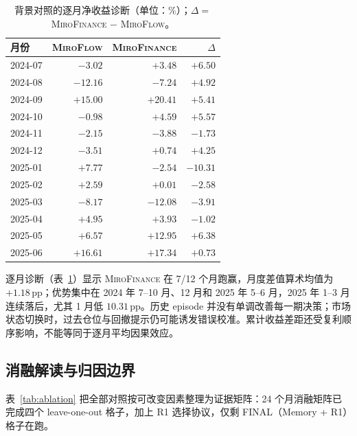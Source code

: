 \documentclass[11pt]{article}
\newcommand{\miroflow}{\textsc{MiroFlow}}
\newcommand{\memskill}{\textsc{MiroFinance}}
\newcommand{\pp}{\,\mathrm{pp}}
\begin{document}
\begin{table}[t]
\centering
\small
\begin{tabular}{@{}lrrr@{}}
\toprule
\textbf{月份} & \textbf{\miroflow{}} & \textbf{\memskill{}} & $\Delta$ \\
\midrule
2024-07 & $-3.02$ & $+3.48$ & $+6.50$ \\
2024-08 & $-12.16$ & $-7.24$ & $+4.92$ \\
2024-09 & $+15.00$ & $+20.41$ & $+5.41$ \\
2024-10 & $-0.98$ & $+4.59$ & $+5.57$ \\
2024-11 & $-2.15$ & $-3.88$ & $-1.73$ \\
2024-12 & $-3.51$ & $+0.74$ & $+4.25$ \\
2025-01 & $+7.77$ & $-2.54$ & $-10.31$ \\
2025-02 & $+2.59$ & $+0.01$ & $-2.58$ \\
2025-03 & $-8.17$ & $-12.08$ & $-3.91$ \\
2025-04 & $+4.95$ & $+3.93$ & $-1.02$ \\
2025-05 & $+6.57$ & $+12.95$ & $+6.38$ \\
2025-06 & $+16.61$ & $+17.34$ & $+0.73$ \\
\bottomrule
\end{tabular}
\caption{背景对照的逐月净收益诊断（单位：\%）；$\Delta=$ \memskill{} $-$ \miroflow{}。}
\label{tab:monthly}
\end{table}

逐月诊断（表~\ref{tab:monthly}）显示 \memskill{} 在 7/12 个月跑赢，月度差值算术均值为 $+1.18\pp$；优势集中在 2024 年 7--10 月、12 月和 2025 年 5--6 月，2025 年 1--3 月连续落后，尤其 1 月低 $10.31\pp$。历史 episode 并没有单调改善每一期决策；市场状态切换时，过去仓位与回撤提示仍可能诱发错误校准。累计收益差距还受复利顺序影响，不能等同于逐月平均因果效应。

\subsection{消融解读与归因边界}
\label{sec:ablation}

表~\ref{tab:ablation} 把全部对照按可改变因素整理为证据矩阵：24 个月消融矩阵已完成四个 leave-one-out 格子，加上 R1 选择协议，仅剩 FINAL（Memory + R1）格子在跑。
\end{document}
